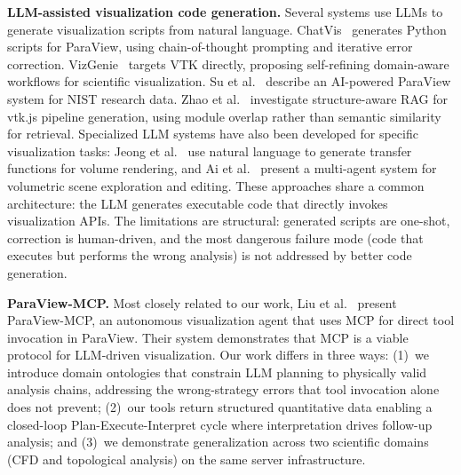 \documentclass{vgtc}                          %
\begin{document}
\textbf{LLM-assisted visualization code generation.}
Several systems use LLMs to generate visualization scripts from natural language.
ChatVis~\cite{Mallick:2024:ChatVis,Peterka:2025:ChatVis} generates Python scripts
for ParaView, using chain-of-thought prompting and iterative error correction.
VizGenie~\cite{Biswas:2025:VizGenie} targets VTK directly, proposing self-refining
domain-aware workflows for scientific visualization.
Su et al.~\cite{Su:2025:NIST} describe an AI-powered ParaView system for NIST
research data.
Zhao et al.~\cite{Zhao:2026:RAG} investigate structure-aware RAG for vtk.js
pipeline generation, using module overlap rather than semantic similarity for
retrieval.
Specialized LLM systems have also been developed for specific visualization
tasks: Jeong et al.~\cite{Jeong:2024:TF} use natural language to generate
transfer functions for volume rendering, and Ai et al.~\cite{Ai:2025:VolVis}
present a multi-agent system for volumetric scene exploration and editing.
These approaches share a common architecture: the LLM generates executable code
that directly invokes visualization APIs.
The limitations are structural: generated scripts are one-shot, correction is
human-driven, and the most dangerous failure mode (code that executes but
performs the wrong analysis) is not addressed by better code generation.

\textbf{ParaView-MCP.}
Most closely related to our work, Liu et al.~\cite{Liu:2025:PVMCP} present
ParaView-MCP, an autonomous visualization agent that uses MCP for direct tool
invocation in ParaView.
Their system demonstrates that MCP is a viable protocol for LLM-driven
visualization.
Our work differs in three ways: (1)~we introduce domain ontologies that
constrain LLM planning to physically valid analysis chains, addressing the
wrong-strategy errors that tool invocation alone does not prevent;
(2)~our tools return structured quantitative data enabling a closed-loop
Plan-Execute-Interpret cycle where interpretation drives follow-up analysis;
and (3)~we demonstrate generalization across two scientific domains (CFD and
topological analysis) on the same server infrastructure.
\end{document}
